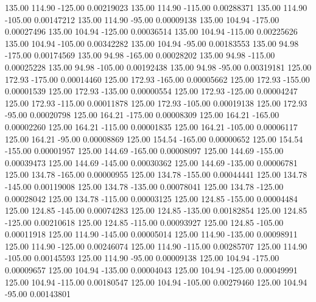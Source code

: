     135.00    114.90   -125.00     0.00219023
    135.00    114.90   -115.00     0.00288371
    135.00    114.90   -105.00     0.00147212
    135.00    114.90    -95.00     0.00009138
    135.00    104.94   -175.00     0.00027496
    135.00    104.94   -125.00     0.00036514
    135.00    104.94   -115.00     0.00225626
    135.00    104.94   -105.00     0.00342282
    135.00    104.94    -95.00     0.00183553
    135.00     94.98   -175.00     0.00174569
    135.00     94.98   -165.00     0.00028202
    135.00     94.98   -115.00     0.00025228
    135.00     94.98   -105.00     0.00192438
    135.00     94.98    -95.00     0.00319181
    125.00    172.93   -175.00     0.00014460
    125.00    172.93   -165.00     0.00005662
    125.00    172.93   -155.00     0.00001539
    125.00    172.93   -135.00     0.00000554
    125.00    172.93   -125.00     0.00004247
    125.00    172.93   -115.00     0.00011878
    125.00    172.93   -105.00     0.00019138
    125.00    172.93    -95.00     0.00020798
    125.00    164.21   -175.00     0.00008309
    125.00    164.21   -165.00     0.00002260
    125.00    164.21   -115.00     0.00001835
    125.00    164.21   -105.00     0.00006117
    125.00    164.21    -95.00     0.00008869
    125.00    154.54   -165.00     0.00000652
    125.00    154.54   -155.00     0.00001957
    125.00    144.69   -165.00     0.00008097
    125.00    144.69   -155.00     0.00039473
    125.00    144.69   -145.00     0.00030362
    125.00    144.69   -135.00     0.00006781
    125.00    134.78   -165.00     0.00000955
    125.00    134.78   -155.00     0.00044441
    125.00    134.78   -145.00     0.00119008
    125.00    134.78   -135.00     0.00078041
    125.00    134.78   -125.00     0.00028042
    125.00    134.78   -115.00     0.00003125
    125.00    124.85   -155.00     0.00004484
    125.00    124.85   -145.00     0.00074283
    125.00    124.85   -135.00     0.00182854
    125.00    124.85   -125.00     0.00210618
    125.00    124.85   -115.00     0.00093927
    125.00    124.85   -105.00     0.00011918
    125.00    114.90   -145.00     0.00005014
    125.00    114.90   -135.00     0.00098911
    125.00    114.90   -125.00     0.00246074
    125.00    114.90   -115.00     0.00285707
    125.00    114.90   -105.00     0.00145593
    125.00    114.90    -95.00     0.00009138
    125.00    104.94   -175.00     0.00009657
    125.00    104.94   -135.00     0.00004043
    125.00    104.94   -125.00     0.00049991
    125.00    104.94   -115.00     0.00180547
    125.00    104.94   -105.00     0.00279460
    125.00    104.94    -95.00     0.00143801
